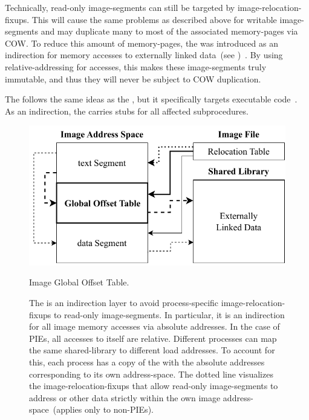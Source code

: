 Technically, read-only \glspl{image-segment} can still be targeted by \glspl{image-relocation-fixup}. This will cause the same problems as described above for writable \glspl{image-segment} and may duplicate many to most of the associated \glspl{memory-page} via \gls{COW}. To reduce this amount of \glspl{memory-page}, the  was introduced as an indirection for memory accesses to externally linked data~(see )~\cite{levine2000linkers,elf-spec}. By using \gls{relative-addressing} for  accesses, this makes these \glspl{image-segment} truly immutable, and thus they will never be subject to \gls{COW} duplication.

The  follows the same ideas as the , but it specifically targets executable code~\cite{levine2000linkers,elf-spec}. As an indirection, the  carries stubs for all affected subprocedures.

\begin{figure}[htb]
  \centering
  \includegraphics{Figures/GOT.pdf}
  \caption{Image Global Offset Table.}
  \label{fig:got}
  \caption*{The  is an indirection layer to avoid process-specific \glspl{image-relocation-fixup} to read-only \glspl{image-segment}. In particular, it is an indirection for all \gls{image} memory accesses via absolute addresses. In the case of \glspl{PIE}, all accesses to  itself are relative. Different processes can map the same \gls{shared-library} to different load addresses. To account for this, each process has a copy of the  with the absolute addresses corresponding to its own \gls{address-space}. The dotted line visualizes the \glspl{image-relocation-fixup} that allow read-only \glspl{image-segment} to address  or other data strictly within the own \gls{image} \gls{address-space}~(applies only to non-\glspl{PIE}).}
\end{figure}

